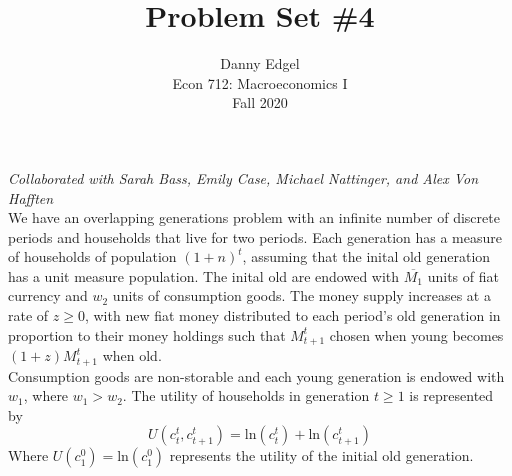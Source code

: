 \documentclass{article}
\newcommand{\loge}[1]{\text{ln}\left(#1\right)}
\begin{document}
\title{	Problem Set \#4 }
\author{ 	Danny Edgel 					\\ 
			Econ 712: Macroeconomics I		\\
			Fall 2020						\\
		}
\maketitle\thispagestyle{empty}


\noindent\textit{Collaborated with Sarah Bass, Emily Case, Michael Nattinger, and Alex Von Hafften}
\bigskip \\
\noindent We have an overlapping generations problem with an infinite number of discrete periods and households that live for two periods. Each generation has a measure of households of population $(1+n)^t$, assuming that the inital old generation has a unit measure population. The inital old are endowed with $\overline{M_1}$ units of fiat currency and $w_2$ units of consumption goods. The money supply increases at a rate of $z\geq 0$, with new fiat money distributed to each period's old generation in proportion to their money holdings such that $M_{t+1}^t$ chosen when young becomes $(1+z)M_{t+1}^t$ when old. \\

Consumption goods are non-storable and each young generation is endowed with $w_1$, where $w_1>w_2$. The utility of households in generation $t\geq 1$ is represented by
\[
	U(c_t^t,c_{t+1}^t) = \loge{c_t^t} + \loge{c_{t+1}^t}
\]
Where $U(c_1^0)=\loge{c_1^0}$ represents the utility of the initial old generation.

\end{document}
